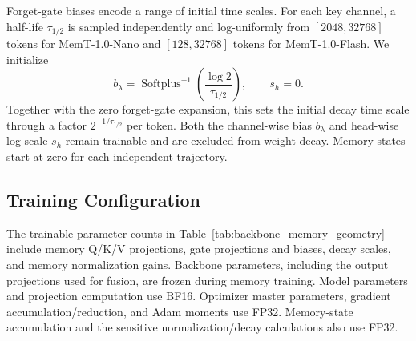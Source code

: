 Forget-gate biases encode a range of initial time scales.
For each key channel, a half-life $\tau_{1/2}$ is sampled independently and log-uniformly from $[2048,32768]$ tokens for MemT-1.0-Nano and $[128,32768]$ tokens for MemT-1.0-Flash.
We initialize
\begin{equation*}
    b_\lambda=\operatorname{Softplus}^{-1}\!\left(\frac{\log 2}{\tau_{1/2}}\right),
    \qquad s_h=0.
\end{equation*}
Together with the zero forget-gate expansion, this sets the initial decay time scale through a factor $2^{-1/\tau_{1/2}}$ per token.
Both the channel-wise bias $b_\lambda$ and head-wise log-scale $s_h$ remain trainable and are excluded from weight decay.
Memory states start at zero for each independent trajectory.

\subsection{Training Configuration}
\label{appendix:memory_training_configuration}

The trainable parameter counts in Table~\ref{tab:backbone_memory_geometry} include memory Q/K/V projections, gate projections and biases, decay scales, and memory normalization gains.
Backbone parameters, including the output projections used for fusion, are frozen during memory training.
Model parameters and projection computation use BF16.
Optimizer master parameters, gradient accumulation/reduction, and Adam moments use FP32.
Memory-state accumulation and the sensitive normalization/decay calculations also use FP32.

